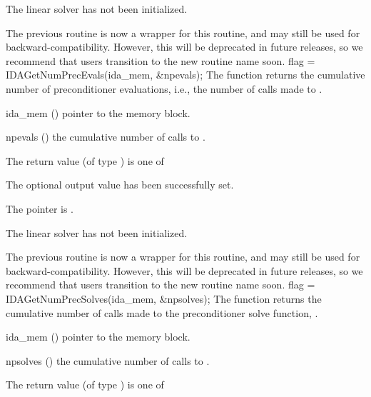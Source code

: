 {{\begin{args}
  \item[\Id{IDALS\_LMEM\_NULL}]
    The {\idals} linear solver has not been initialized.
  \end{args}
}
{
  The previous routine  is now a wrapper for
  this routine, and may still be used for backward-compatibility.
  However, this will be deprecated in future releases, so we recommend
  that users transition to the new routine name soon.
}
{
  flag = IDAGetNumPrecEvals(ida\_mem, \&npevals);
}
{
  The function  returns the
  cumulative number of preconditioner evaluations, i.e., the number of
  calls made to .
}
{
  \begin{args}
  \item[ida\_mem] ()
    pointer to the {\idas} memory block.
  \item[npevals] ()
    the cumulative number of calls to .
  \end{args}
}
{
  The return value  (of type ) is one of
  \begin{args}
  \item[\Id{IDALS\_SUCCESS}]
    The optional output value has been successfully set.
  \item[\Id{IDALS\_MEM\_NULL}]
    The  pointer is .
  \item[\Id{IDALS\_LMEM\_NULL}]
    The {\idals} linear solver has not been initialized.
  \end{args}
}
{
  The previous routine  is now a wrapper for
  this routine, and may still be used for backward-compatibility.
  However, this will be deprecated in future releases, so we recommend
  that users transition to the new routine name soon.
}
{
  flag = IDAGetNumPrecSolves(ida\_mem, \&npsolves);
}
{
  The function  returns the
  cumulative number of calls made to the preconditioner
  solve function, .
}
{
  \begin{args}
  \item[ida\_mem] ()
    pointer to the {\idas} memory block.
  \item[npsolves] ()
    the cumulative number of calls to .
  \end{args}
}
{
  The return value  (of type ) is one of
  \begin{args}

\end{args}}}
